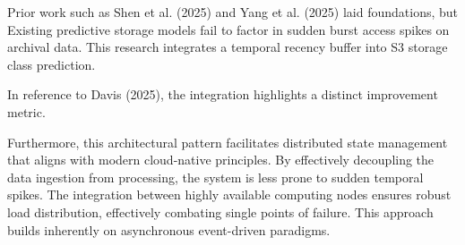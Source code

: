 Prior work such as Shen et al. (2025) and Yang et al. (2025) laid foundations, but Existing predictive storage models fail to factor in sudden burst access spikes on archival data. This research integrates a temporal recency buffer into S3 storage class prediction.

In reference to Davis (2025), the integration highlights a distinct improvement metric.


Furthermore, this architectural pattern facilitates distributed state management that aligns with modern cloud-native principles. 
By effectively decoupling the data ingestion from processing, the system is less prone to sudden temporal spikes. 
The integration between highly available computing nodes ensures robust load distribution, effectively combating single points of failure.
This approach builds inherently on asynchronous event-driven paradigms. 

